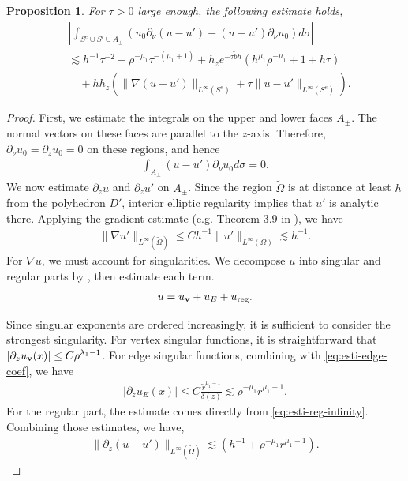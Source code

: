 ﻿\documentclass[11pt,reqno,oneside]{amsart}
\newtheorem{proposition}[theorem]{Proposition}
\theoremstyle{definition}
\theoremstyle{remark}
\newcommand{\n}{\nabla}
\renewcommand{\d}{\delta}
\newcommand{\lm}{\lambda}
\newcommand{\p}{\partial}
\renewcommand{\O}{\Omega}
\newcommand{\ds}{\displaystyle}
\begin{document}
        \begin{proposition}\label{prop:upperbound}
            For $\tau>0$ large enough, the following estimate holds,
            \begin{align*}
                &\left|\int_{S^e \cup S^i\cup A_{\pm}} \left(u_0\p_\nu (u-u')-(u-u')\p_\nu u_0\right)d\sigma\right|\\
                &\lesssim h^{-1}\tau^{-2}+\rho^{-\mu_1}\tau^{-(\mu_1+1)}+h_z e^{-\tau \widetilde{b} h} (h^{\mu_1}\rho^{-\mu_1}+1+h\tau)\\
                &\quad +h h_z \left(\|\n(u-u')\|_{L^\infty(S^e)}+\tau\|u-u'\|_{L^\infty(S^e)}\right).
            \end{align*}
        \end{proposition}
        \begin{proof}
            First, we estimate the integrals on the upper and lower faces $A_\pm$. The normal vectors on these faces are parallel to the $z$-axis. Therefore, $\p_\nu u_0=\p_z u_0=0$ on these regions, and hence
            \begin{align*}
                \int_{A_\pm} (u-u')\p_\nu u_0 d\sigma =0.
            \end{align*}
            We now estimate $\p_z u$ and $\p_z u'$ on $A_\pm$. Since the region $\widetilde{\O}$ is at distance at least $h$ from the polyhedron $D'$, interior elliptic regularity implies that $u'$ is analytic there. Applying the gradient estimate (e.g. Theorem 3.9 in \cite{Gilbarg-Trudinger}), we have
            \begin{align}\label{eq:esti-grad-uprime}
                \|\n u'\|_{L^\infty(\widetilde{\O})} \leq C h^{-1} \|u'\|_{L^\infty(\O)}\lesssim h^{-1}.
            \end{align}
            For $\n u$, we must account for singularities. We decompose $u$ into singular and regular parts by , then estimate each term.
            \begin{align*}
                u=u_{\bf v}+u_{E} +u_{\rm reg}.
            \end{align*}

            Since singular exponents are ordered increasingly, it is sufficient to consider the strongest singularity. For vertex singular functions, it is straightforward that $\ds |\p_z u_{\bf v}(x)| \leq C \rho^{\lm_1-1}$. For edge singular functions, combining  with \eqref{eq:esti-edge-coef}, we have
            \begin{align*}
                |\p_z u_{E}(x)| \leq C \frac{\widetilde{r}^{\mu_1-1}}{\d(z)}\lesssim \rho^{-\mu_1}r^{\mu_1-1}.
            \end{align*}
            For the regular part, the estimate comes directly from \eqref{eq:esti-reg-infinity}. Combining those estimates, we have,
            \begin{align*}
                \|\p_z (u-u')\|_{L^\infty(\widetilde{\O})} \lesssim (h^{-1} +\rho^{-\mu_1}r^{\mu_1-1}).
            \end{align*}
            

\end{proof}
\end{document}
